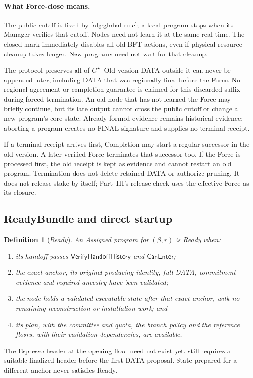 \documentclass[11pt,a4paper]{article}
\newcommand{\tagg}[1]{\ensuremath{\mathsf{#1}}}
\newcommand{\defterm}[1]{\textcolor{rrBlue}{\textit{#1}}}
\newtheorem{definition}{Definition}[section]
\newcounter{protocol}
\begin{document}
\paragraph{What Force-close means.}
\label{sec:force-close}
The public cutoff is fixed by \cref{alg:global-rule}; a local program
stops when its Manager verifies that cutoff. Nodes need not learn it
at the same real time. The closed mark immediately disables all old
BFT actions, even if physical resource cleanup takes longer. New
programs need not wait for that cleanup.

The protocol preserves all of $G^\star$. Old-version DATA outside it
can never be appended later, including DATA that was regionally final
before the Force. No regional agreement or completion guarantee is
claimed for this discarded suffix during forced termination. An old
node that has not learned the Force may briefly continue, but its late
output cannot cross the public cutoff or change a new program's core
state. Already formed evidence remains historical evidence; aborting a
program creates no FINAL signature and supplies no terminal receipt.

If a terminal receipt arrives first, Completion may start a regular
successor in the old version. A later verified Force terminates that
successor too. If the Force is processed first, the old receipt is kept
as evidence and cannot restart an old program. Termination does not
delete retained DATA or authorize pruning. It does not release stake by
itself; Part~III's release check uses the effective Force as its closure.

\subsection{ReadyBundle and direct startup}
\label{sec:ready}
\begin{definition}[\defterm{Ready}]
\label{def:ready}
An Assigned program for $(\beta,r)$ is Ready when:
\begin{enumerate}[label=(\roman*),itemsep=2pt]
\item its handoff passes \tagg{VerifyHandoffHistory} and
\tagg{CanEnter};
\item the exact anchor, its original producing identity, full DATA,
commitment evidence and required ancestry have been validated;
\item the node holds a validated executable state after that exact
anchor, with no remaining reconstruction or installation work; and
\item its plan, with the committee and quota, the branch policy and the
reference floors, with their validation dependencies, are available.
\end{enumerate}
\end{definition}
The Espresso header at the opening floor need not exist yet.
 still requires a suitable finalized header before the
first DATA proposal. State prepared for a different anchor never
satisfies Ready.
\end{document}
